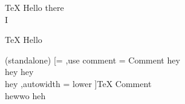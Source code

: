 \documentclass[11pt]{book}
\begin{document}
\begin{code}[autowidth = lower, listing and text]{\TeX}
    \centering
    Hello \hspace{5cm} there\\
    I
\end{code}
\begin{code}[autowidth = lower, use comment = {Comment!}]{\TeX}
    Hello
\end{code}

\begin{code}(standalone)
[=
,use comment = {Comment \unexpanded{\hspace{5cm}} hey\\ hey  hey\\ hey}
,autowidth = lower
]{\TeX}
Comment\\ hewwo \hspace{10cm} heh
\end{code}
\end{document}
